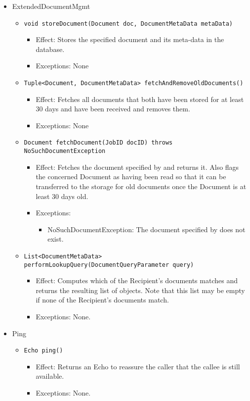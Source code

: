 \begin{itemize}
    \item ExtendedDocumentMgmt
	\begin{itemize}
		\item \texttt{void storeDocument(Document doc, DocumentMetaData metaData)}
		\begin{itemize}
			\item Effect: Stores the specified document and its meta-data in the database.
			\item Exceptions: None
		\end{itemize}

		\item \texttt{Tuple<Document, DocumentMetaData> fetchAndRemoveOldDocuments()}
		\begin{itemize}
			\item Effect: Fetches all documents that both have been stored for at least 30 days and have been received and removes them.
			\item Exceptions: None
		\end{itemize}

		\item \texttt{Document fetchDocument(JobID docID) throws NoSuchDocumentException}
		\begin{itemize}
			\item Effect: Fetches the document specified by  and returns it. Also flags the concerned Document as having been read so that it can be transferred to the storage for old documents once the Document is at least 30 days old.
			\item Exceptions:
			\begin{itemize}
				\item NoSuchDocumentException: The document specified by  does not exist.
			\end{itemize}
		\end{itemize}
				
		\item \texttt{List<DocumentMetaData> performLookupQuery(DocumentQueryParameter query)}
		\begin{itemize}
			\item Effect: Computes which of the Recipient's documents matches  and returns the resulting list of  objects. Note that this list may be empty if none of the Recipient's documents match.
			\item Exceptions: None.
		\end{itemize}
	\end{itemize}

	\item Ping
	\begin{itemize}
		\item \texttt{Echo ping()}
		\begin{itemize}
			\item Effect: Returns an Echo to reassure the caller that the callee is still available.
			\item Exceptions: None.
		\end{itemize}
	\end{itemize}
\end{itemize}

